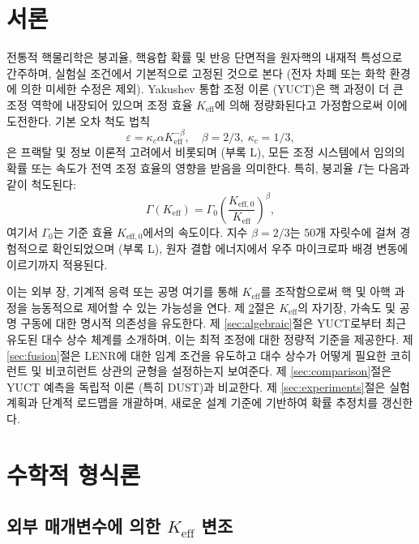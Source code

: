 \documentclass[11pt,a4paper]{article}
\theoremstyle{remark}
\newcommand{\Keff}{K_{\mathrm{eff}}}
\newcommand{\Keffzero}{K_{\mathrm{eff},0}}
\begin{document}
	\tableofcontents
	\newpage
	
	\section{서론}
	\label{sec:intro}
	
	전통적 핵물리학은 붕괴율, 핵융합 확률 및 반응 단면적을 원자핵의 내재적 특성으로 간주하며, 실험실 조건에서 기본적으로 고정된 것으로 본다 (전자 차폐 또는 화학 환경에 의한 미세한 수정은 제외). Yakushev 통합 조정 이론 (YUCT)은 핵 과정이 더 큰 조정 역학에 내장되어 있으며 조정 효율 \(\Keff\)에 의해 정량화된다고 가정함으로써 이에 도전한다. 기본 오차 척도 법칙
	\begin{equation}
		\varepsilon = \kappa_c \alpha \Keff^{-\beta}, \quad \beta = 2/3,\ \kappa_c = 1/3,
		\label{eq:universal-scaling}
	\end{equation}
	은 프랙탈 및 정보 이론적 고려에서 비롯되며 (부록 L), 모든 조정 시스템에서 임의의 확률 또는 속도가 전역 조정 효율의 영향을 받음을 의미한다. 특히, 붕괴율 \(\Gamma\)는 다음과 같이 척도된다:
	\begin{equation}
		\Gamma(\Keff) = \Gamma_0 \left( \frac{\Keffzero}{\Keff} \right)^{\beta},
		\label{eq:decay-rate}
	\end{equation}
	여기서 \(\Gamma_0\)는 기준 효율 \(\Keffzero\)에서의 속도이다. 지수 \(\beta = 2/3\)는 50개 자릿수에 걸쳐 경험적으로 확인되었으며 (부록 L), 원자 결합 에너지에서 우주 마이크로파 배경 변동에 이르기까지 적용된다.
	
	이는 외부 장, 기계적 응력 또는 공명 여기를 통해 \(\Keff\)를 조작함으로써 핵 및 아핵 과정을 능동적으로 제어할 수 있는 가능성을 연다. 제 \ref{sec:math}절은 \(\Keff\)의 자기장, 가속도 및 공명 구동에 대한 명시적 의존성을 유도한다. 제 \ref{sec:algebraic}절은 YUCT로부터 최근 유도된 대수 상수 체계를 소개하며, 이는 최적 조정에 대한 정량적 기준을 제공한다. 제 \ref{sec:fusion}절은 LENR에 대한 임계 조건을 유도하고 대수 상수가 어떻게 필요한 코히런트 및 비코히런트 상관의 균형을 설정하는지 보여준다. 제 \ref{sec:comparison}절은 YUCT 예측을 독립적 이론 (특히 DUST)과 비교한다. 제 \ref{sec:experiments}절은 실험 계획과 단계적 로드맵을 개괄하며, 새로운 설계 기준에 기반하여 확률 추정치를 갱신한다.
	
	\section{수학적 형식론}
	\label{sec:math}
	
	\subsection{외부 매개변수에 의한 \(\Keff\) 변조}
	
\end{document}
